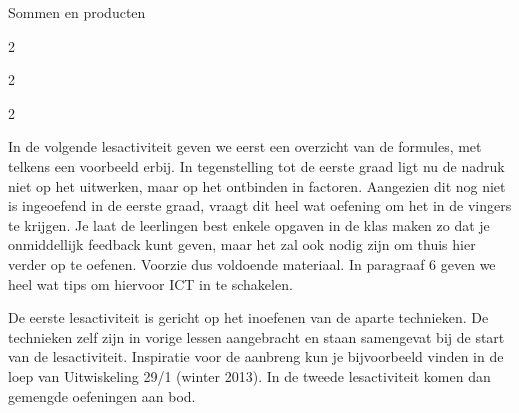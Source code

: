 \begin{lesactiviteit}{Sommen en producten}
\begin{vraagenantwoord}
\begin{multicols}{2}
   \end{multicols}
   \begin{multicols}{2}
      \begin{vraagenantwoord}
      \end{vraagenantwoord}
  \end{multicols} 
  
\end{vraagenantwoord}       
\end{lesactiviteit}


\begin{multicols}{2}
    
In de volgende lesactiviteit geven we eerst een overzicht van de formules, met telkens een voorbeeld erbij. In tegenstelling tot de eerste graad ligt nu de nadruk niet op het uitwerken, maar op het ontbinden in factoren. Aangezien dit nog niet is ingeoefend in de eerste graad, vraagt dit heel wat oefening om het in de vingers te krijgen. Je laat de leerlingen best enkele opgaven in de klas maken zo dat je onmiddellijk feedback kunt geven, maar het zal ook nodig zijn om thuis hier verder op te oefenen. Voorzie dus voldoende materiaal. In paragraaf 6 geven we heel wat tips om hiervoor ICT in te schakelen. 

De eerste lesactiviteit is gericht op het inoefenen van de aparte technieken. De technieken zelf zijn in vorige lessen aangebracht en staan samengevat bij de start van de lesactiviteit. Inspiratie voor de aanbreng kun je bijvoorbeeld vinden in de loep van Uitwiskeling 29/1 (winter 2013). In de tweede lesactiviteit komen dan gemengde oefeningen aan bod. 
\end{multicols}
\clearpage


